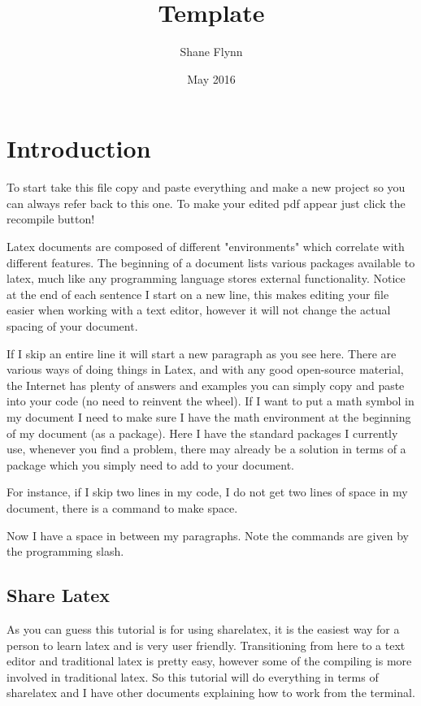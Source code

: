 \documentclass{article}
\title{\textbf{Template}}
\author{Shane Flynn }
\date{May 2016}
\begin{document}
\maketitle

\section{Introduction}
To start take this file copy and paste everything and make a new project so you can always refer back to this one.
To make your edited pdf appear just click the recompile button!

Latex documents are composed of different "environments" which correlate with different features. 
The beginning of a document lists various packages available to latex, much like any programming language stores external functionality.
Notice at the end of each sentence I start on a new line, this makes editing your file easier when working with a text editor, however it will not change the actual spacing of your document. 

If I skip an entire line it will start a new paragraph as you see here. 
There are various ways of doing things in Latex, and with any good open-source material, the Internet has plenty of answers and examples you can simply copy and paste into your code (no need to reinvent the wheel). 
If I want to put a math symbol in my document I need to make sure I have the math environment at the beginning of my document (as a package).
Here I have the standard packages I currently use, whenever you find a problem, there may already be a solution in terms of a package which you simply need to add to your document. 


For instance, if I skip two lines in my code, I do not get two lines of space in my document, there is a command to make space. 

\bigskip

Now I have a space in between my paragraphs.
Note the commands are given by the programming slash.
\subsection{Share Latex}
As you can guess this tutorial is for using sharelatex, it is the easiest way for a person to learn latex and is very user friendly.
Transitioning from here to a text editor and traditional latex is pretty easy, however some of the compiling is more involved in traditional latex.
So this tutorial will do everything in terms of sharelatex and I have other documents explaining how to work from the terminal. 
\end{document}
